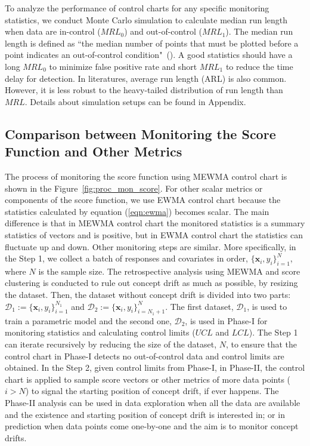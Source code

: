 \documentclass[twoside,11pt]{article}
\begin{document}
To analyze the performance of control charts for any specific monitoring statistics, we conduct Monte Carlo simulation to calculate median run length when data are in-control ($MRL_0$) and out-of-control ($MRL_1$). The median run length is defined as ``the median number of points that must be plotted before a point indicates an out-of-control condition"~(\cite{montgomery2007introduction}). A good statistics should have a long $MRL_0$ to minimize false positive rate and short $MRL_1$ to reduce the time delay for detection. In literatures, average run length (ARL) is also common. However, it is less robust to the heavy-tailed distribution of run length than $MRL$. Details about simulation setups can be found in Appendix. 

\subsection{Comparison between Monitoring the Score Function and Other Metrics}
\label{ss:comp_other_metrics}
The process of monitoring the score function using MEWMA control chart is shown in the Figure~\ref{fig:proc_mon_score}. For other scalar metrics or components of the score function, we use EWMA control chart because the statistics calculated by equation (\ref{eqn:ewma}) becomes scalar. The main difference is that in MEWMA control chart the monitored statistics is a summary statistics of vectors and is positive, but in EWMA control chart the statistics can fluctuate up and down. Other monitoring steps are similar. More specifically, in the Step 1, we collect a batch of responses and covariates in order, $\{\bm {x}_i, y_i\} _{i=1} ^{N}$, where $N$ is the sample size. The retrospective analysis using MEWMA and score clustering is conducted to rule out concept drift as much as possible, by resizing the dataset. Then, the dataset without concept drift is divided into two parts: $ \mathcal{D}_1 := \{\bm {x}_i, y_i\} _{i=1} ^{N_1}$ and $\mathcal{D}_2 := \{\bm {x}_i, y_i\} _{i=N_1+1} ^{N}$. The first dataset, $\mathcal{D}_1$, is used to train a parametric model and the second one, $\mathcal{D}_2$, is used in Phase-I for monitoring statistics and calculating control limits ($UCL$ and $LCL$). The Step 1 can iterate recursively by reducing the size of the dataset, $N$, to ensure that the control chart in Phase-I detects no out-of-control data and control limits are obtained. In the Step 2, given control limits from Phase-I, in Phase-II, the control chart is applied to sample score vectors or other metrics of more data points ($i > N$) to signal the starting position of concept drift, if ever happens. The Phase-II analysis can be used in data exploration when all the data are available and the existence and starting position of concept drift is interested in; or in prediction when data points come one-by-one and the aim is to monitor concept drifts. 
\end{document}
